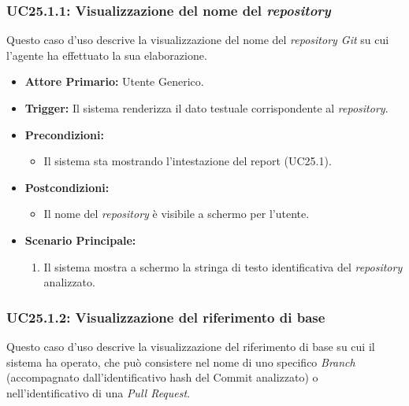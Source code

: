 \documentclass[12pt, a4paper]{article}
\begin{document}
\subsubsection{UC25.1.1: Visualizzazione del nome del \textit{repository}}\label{uc:25.1.1}
Questo caso d'uso descrive la visualizzazione del nome del \textit{repository Git} su cui l'agente ha effettuato la sua elaborazione.

\begin{itemize}
    \item \textbf{Attore Primario:} Utente Generico.
    \item \textbf{Trigger:} Il sistema renderizza il dato testuale corrispondente al \textit{repository}.
    \item \textbf{Precondizioni:}
    \begin{itemize}
        \item Il sistema sta mostrando l'intestazione del report (UC25.1).
    \end{itemize}
    \item \textbf{Postcondizioni:}
    \begin{itemize}
        \item Il nome del \textit{repository} è visibile a schermo per l'utente.
    \end{itemize}
    \item \textbf{Scenario Principale:}
    \begin{enumerate}
        \item Il sistema mostra a schermo la stringa di testo identificativa del \textit{repository} analizzato.
    \end{enumerate}
\end{itemize}

\subsubsection{UC25.1.2: Visualizzazione del riferimento di base}\label{uc:25.1.2}
Questo caso d'uso descrive la visualizzazione del riferimento di base su cui il sistema ha operato, che può consistere nel nome di uno specifico \textit{Branch} (accompagnato dall'identificativo hash del Commit analizzato) o nell'identificativo di una \textit{Pull Request}.
\end{document}
